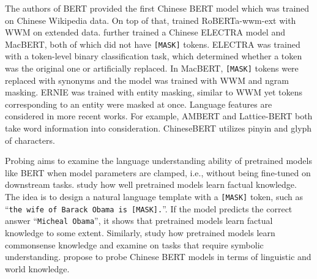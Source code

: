 \documentclass[11pt]{article}
\begin{document}
The authors of BERT \cite{devlin2018bert} provided the first Chinese BERT model which was trained on Chinese Wikipedia data. On top of that, \citet{cui2019pre} trained RoBERTa-wwm-ext with WWM on extended data. 
\citet{cui-etal-2020-revisiting} further trained a Chinese ELECTRA model and MacBERT, both of which did not have \texttt{[MASK]} tokens. 
ELECTRA was trained with a token-level binary classification task, which determined whether a token was the original one or artificially replaced. 
In MacBERT, \texttt{[MASK]} tokens were replaced with synonyms and the model was trained with WWM and ngram masking.
ERNIE \cite{sun2019ernie} was trained with entity masking, similar to WWM yet tokens corresponding to an entity were masked at once.
Language features are considered in more recent works. 
For example, AMBERT \cite{zhang2020ambert} and Lattice-BERT \cite{lai2021lattice} both take word information into consideration. 
ChineseBERT \cite{sun2021chinesebert} utilizes pinyin and glyph of characters. 

Probing aims to examine the language understanding ability of pretrained models like BERT when model parameters are clamped, i.e., without being fine-tuned on downstream tasks.
\citet{petroni2019language} study how well pretrained models learn factual knowledge. The idea is to design a natural language template with a \texttt{[MASK]} token, such as ``\texttt{the wife of Barack Obama is \texttt{[MASK]}.}''. If the model  predicts the correct answer 
``\texttt{Micheal Obama}'', it shows that pretrained models learn factual knowledge to some extent.
Similarly, \citet{davison2019commonsense} study how pretrained models learn commonsense knowledge and \citet{talmor2020olmpics} examine on tasks that require symbolic understanding. 
\citet{wang2020intrinsic} propose to probe Chinese BERT models in terms of linguistic and world knowledge.
\end{document}
